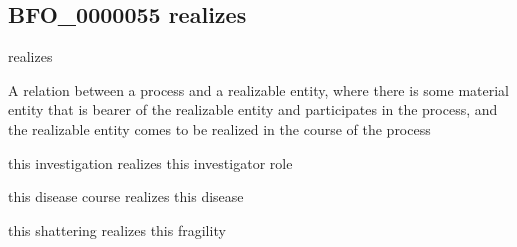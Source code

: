 \documentclass[letterpaper,10pt,english]{sphinxmanual}
\begin{document}
\begin{sphinxShadowBox}

\sphinxAtStartPar
{}
\end{sphinxShadowBox}
\begin{quote}

\ignorespaces \end{quote}


\subsection{BFO\_0000055 \sphinxhyphen{} realizes}
\label{\detokenize{doc-BFO_0000055:bfo-0000055-realizes}}\label{\detokenize{doc-BFO_0000055:index-0}}\label{\detokenize{doc-BFO_0000055::doc}}
\begin{sphinxShadowBox}

\sphinxAtStartPar
realizes
\end{sphinxShadowBox}

\begin{sphinxShadowBox}

\sphinxAtStartPar
A relation between a process and a realizable entity, where there is some material entity that is bearer of the realizable entity and participates in the process, and the realizable entity comes to be realized in the course of the process
\end{sphinxShadowBox}

\begin{sphinxShadowBox}

\sphinxAtStartPar
this investigation realizes this investigator role

\sphinxAtStartPar
this disease course realizes this disease

\sphinxAtStartPar
this shattering realizes this fragility
\end{sphinxShadowBox}

\begin{sphinxShadowBox}

\sphinxAtStartPar
{}
\end{sphinxShadowBox}
\begin{quote}

\ignorespaces \end{quote}
\end{document}
